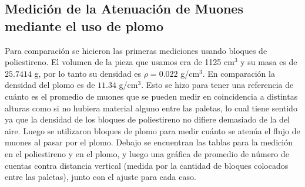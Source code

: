 \documentclass[a4paper,10pt]{article}
\numberwithin{equation}{section}
\begin{document}
\subsection{Medición de la Atenuación de Muones mediante el uso de plomo}

Para comparación se hicieron las primeras mediciones usando bloques de poliestireno.
El volumen de la pieza que usamos era de 1125 cm$^3$ y su masa es de $25.7414$ g, por lo tanto 
su densidad es $\rho = 0.022$ g/cm$^3$. En comparación la densidad del plomo es de 
$11.34$ g/cm$^3$. Esto se hizo para tener una referencia de cuánto es el promedio 
de muones que se pueden medir en coincidencia a distintas alturas como si no hubiera 
material alguno entre las paletas, lo cual tiene sentido ya que la densidad de los 
bloques de poliestireno no difiere demasiado de la del aire. Luego se utilizaron 
bloques de plomo para medir cuánto se atenúa el flujo de muones al pasar por el 
plomo. Debajo se encuentran las tablas para la medición en el poliestireno 
y en el plomo, y luego una gráfica de promedio de número de cuentas contra 
distancia vertical (medida por la cantidad de bloques colocados entre las 
paletas), junto con el ajuste para cada caso.

\begin{table}[H]
\centering
\caption{Medición con poliestireno.}
\end{table}
\end{document}

